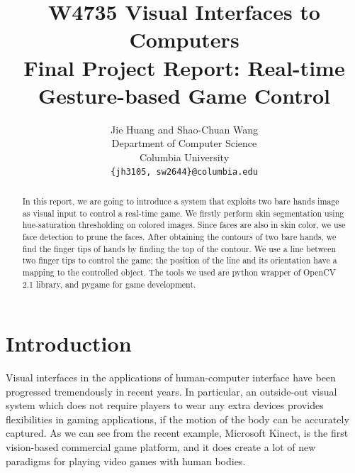 \documentclass[10pt,twocolumn,letterpaper]{article}
\begin{document}
\title{W4735 Visual Interfaces to Computers\\Final Project Report: Real-time Gesture-based Game Control}
\author{Jie Huang and Shao-Chuan Wang\\
Department of Computer Science\\
Columbia University\\
{\tt\small \{jh3105, sw2644\}@columbia.edu}
}

\maketitle
\thispagestyle{empty}

\begin{abstract}
In this report, we are going to introduce a system that exploits two bare hands image 
as visual input to control a real-time game. We firstly perform skin segmentation using hue-saturation 
thresholding on colored images. Since faces are also in skin color, we 
use face detection to prune the faces. After obtaining the contours of two 
bare hands, we find the finger tips of hands by finding the top of the contour.
We use a line between two finger tips to control the game; the position of the line 
and its orientation have a mapping to the controlled object. The tools we used are python wrapper 
of OpenCV 2.1 library, and pygame for game development.
\end{abstract}


\section{Introduction}

Visual interfaces in the applications of human-computer interface 
have been progressed tremendously in recent years. In particular, an outside-out 
visual system \cite{outout} which does not require players to wear 
any extra devices provides flexibilities in gaming applications, if 
the motion of the body can be accurately captured.
As we can see from the recent example, Microsoft Kinect, is the 
first vision-based commercial game platform, and it does 
create a lot of new paradigms for playing video games with human bodies. 
\end{document}
